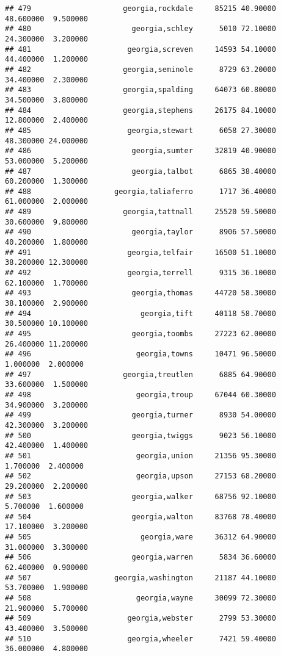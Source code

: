 \documentclass[
]{article}
\begin{document}
\begin{verbatim}
## 479                     georgia,rockdale     85215 40.90000 48.600000  9.500000
## 480                       georgia,schley      5010 72.10000 24.300000  3.200000
## 481                      georgia,screven     14593 54.10000 44.400000  1.200000
## 482                     georgia,seminole      8729 63.20000 34.400000  2.300000
## 483                     georgia,spalding     64073 60.80000 34.500000  3.800000
## 484                     georgia,stephens     26175 84.10000 12.800000  2.400000
## 485                      georgia,stewart      6058 27.30000 48.300000 24.000000
## 486                       georgia,sumter     32819 40.90000 53.000000  5.200000
## 487                       georgia,talbot      6865 38.40000 60.200000  1.300000
## 488                   georgia,taliaferro      1717 36.40000 61.000000  2.000000
## 489                     georgia,tattnall     25520 59.50000 30.600000  9.800000
## 490                       georgia,taylor      8906 57.50000 40.200000  1.800000
## 491                      georgia,telfair     16500 51.10000 38.200000 12.300000
## 492                      georgia,terrell      9315 36.10000 62.100000  1.700000
## 493                       georgia,thomas     44720 58.30000 38.100000  2.900000
## 494                         georgia,tift     40118 58.70000 30.500000 10.100000
## 495                       georgia,toombs     27223 62.00000 26.400000 11.200000
## 496                        georgia,towns     10471 96.50000  1.000000  2.000000
## 497                     georgia,treutlen      6885 64.90000 33.600000  1.500000
## 498                        georgia,troup     67044 60.30000 34.900000  3.200000
## 499                       georgia,turner      8930 54.00000 42.300000  3.200000
## 500                       georgia,twiggs      9023 56.10000 42.400000  1.400000
## 501                        georgia,union     21356 95.30000  1.700000  2.400000
## 502                        georgia,upson     27153 68.20000 29.200000  2.200000
## 503                       georgia,walker     68756 92.10000  5.700000  1.600000
## 504                       georgia,walton     83768 78.40000 17.100000  3.200000
## 505                         georgia,ware     36312 64.90000 31.000000  3.300000
## 506                       georgia,warren      5834 36.60000 62.400000  0.900000
## 507                   georgia,washington     21187 44.10000 53.700000  1.900000
## 508                        georgia,wayne     30099 72.30000 21.900000  5.700000
## 509                      georgia,webster      2799 53.30000 43.400000  3.500000
## 510                      georgia,wheeler      7421 59.40000 36.000000  4.800000

\end{verbatim}
\end{document}
